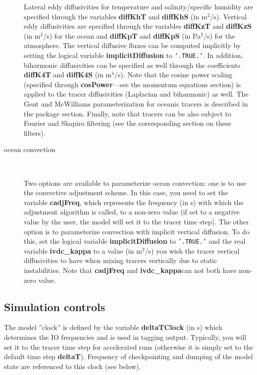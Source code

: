 \begin{description}
  Lateral eddy diffusivities for temperature and salinity/specific
  humidity are specified through the variables \textbf{diffKhT} and
  \textbf{diffKhS} (in m$^{2}$/s). Vertical eddy diffusivities are
  specified through the variables \textbf{diffKzT} and
  \textbf{diffKzS} (in m$^{2}$/s) for the ocean and \textbf{diffKpT
  }and \textbf{diffKpS} (in Pa$^{2}$/s) for the atmosphere. The
  vertical diffusive fluxes can be computed implicitly by setting the
  logical variable \textbf{implicitDiffusion} to \texttt{'.TRUE.'}.
  In addition, biharmonic diffusivities can be specified as well
  through the coefficients \textbf{diffK4T} and \textbf{diffK4S} (in
  m$^{4}$/s). Note that the cosine power scaling (specified through
  \textbf{cosPower}---see the momentum equations section) is applied to
  the tracer diffusivities (Laplacian and biharmonic) as well. The
  Gent and McWilliams parameterization for oceanic tracers is
  described in the package section. Finally, note that tracers can be
  also subject to Fourier and Shapiro filtering (see the corresponding
  section on these filters).

\item[ocean convection] \ 
  
  Two options are available to parameterize ocean convection: one is
  to use the convective adjustment scheme. In this case, you need to
  set the variable \textbf{cadjFreq}, which represents the frequency
  (in s) with which the adjustment algorithm is called, to a non-zero
  value (if set to a negative value by the user, the model will set it
  to the tracer time step). The other option is to parameterize
  convection with implicit vertical diffusion. To do this, set the
  logical variable \textbf{implicitDiffusion} to \texttt{'.TRUE.'}
  and the real variable \textbf{ivdc\_kappa} to a value (in m$^{2}$/s)
  you wish the tracer vertical diffusivities to have when mixing
  tracers vertically due to static instabilities. Note that
  \textbf{cadjFreq} and \textbf{ivdc\_kappa}can not both have non-zero
  value.

\end{description}

\subsection{Simulation controls}

The model ''clock'' is defined by the variable \textbf{deltaTClock}
(in s) which determines the IO frequencies and is used in tagging
output.  Typically, you will set it to the tracer time step for
accelerated runs (otherwise it is simply set to the default time step
\textbf{deltaT}).  Frequency of checkpointing and dumping of the model
state are referenced to this clock (see below).

